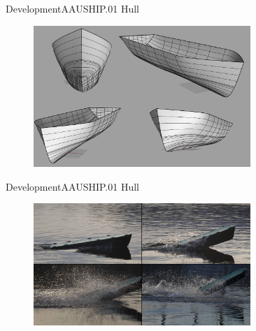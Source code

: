 \documentclass[10pt]{beamer}
\begin{document}
\begin{frame}{Development}{AAUSHIP.01 Hull}
\begin{figure}
	\begin{center}
		\includegraphics[width=8.2cm]{img/rendermontage}
		\label{fig:render}
	\end{center}
\end{figure}
\end{frame}

\begin{frame}{Development}{AAUSHIP.01 Hull}
\begin{figure}
	\begin{center}
		\includegraphics[width=8.2cm]{img/VerticalJumpingTele}
		\label{fig:jumping}
	\end{center}
\end{figure}
\end{frame}

\end{document}
